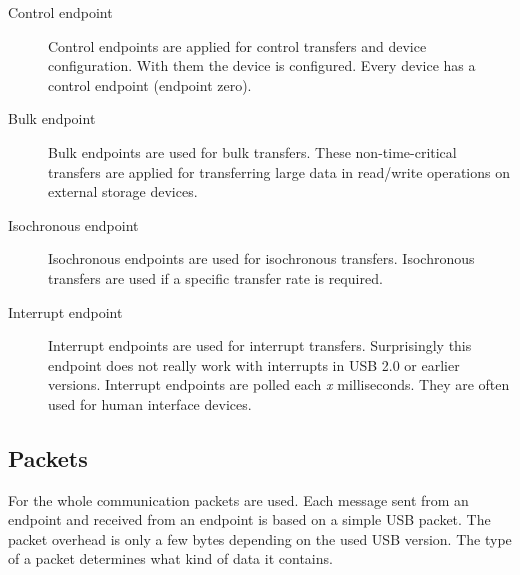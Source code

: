 \documentclass{acm_proc_article-sp}
\begin{document}
\begin{description}
\item[Control endpoint]
Control endpoints are applied for control transfers and device configuration.
With them the device is configured.
Every device has a control endpoint (endpoint zero). \cite{usb}

\item[Bulk endpoint]
Bulk endpoints are used for bulk transfers.
These non-time-critical transfers are applied for transferring large data
in read/write operations on external storage devices. \cite{usb}

\item[Isochronous endpoint]
Isochronous endpoints are used for isochronous transfers.
Isochronous transfers are used if a specific transfer rate is required. \cite{usb}

\item[Interrupt endpoint]
Interrupt endpoints are used for interrupt transfers.
Surprisingly this endpoint does not really work with interrupts in USB 2.0 or earlier versions.
Interrupt endpoints are polled each \emph{x} milliseconds.
They are often used for human interface devices. \cite{usb}

\end{description}

\subsection{Packets}
For the whole communication packets are used.
Each message sent from an endpoint and received from an endpoint is based on a simple USB packet.
The packet overhead is only a few bytes depending on the used USB version.
The type of a packet determines what kind of data it contains.
\end{document}

